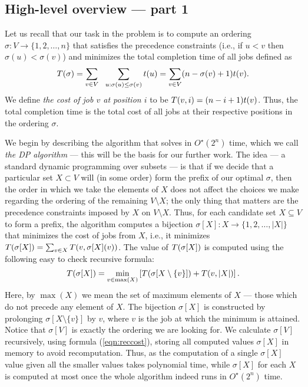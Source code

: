 \documentclass{article}
\theoremstyle{definition}
\begin{document}
\subsection{High-level overview --- part 1}\label{sec:high-level1}
Let us recall that our task in the \schedname{} problem is to compute an ordering $\sigma:V \to \{1,2,\ldots,n\}$
that satisfies the precedence constraints (i.e., if $u < v$ then $\sigma(u) < \sigma(v)$)
and minimizes the total completion time of all jobs defined as
$$\koszt{\sigma} = \sum_{v \in V}\ \ \sum_{u:\sigma(u) \leq \sigma(v)} \czas{u} = \sum_{v \in V} (n-\sigma(v)+1)\czas{v}.$$
We define {\em{the cost of job $v$ at position $i$}} to be $T(v, i) = (n-i+1)t(v)$.
Thus, the total completion time is the total cost of all jobs at their respective
positions in the ordering $\sigma$.

We begin by describing the algorithm that solves \schedname in $O^\star(2^n)$ time, which we call {\em{the DP algorithm}}
--- this will be the basis for our further work.
The idea --- a standard dynamic programming over subsets --- is that if we decide that a particular
set $X \subset V$ will (in some order) form the prefix of our optimal $\sigma$, then the order
in which we take the elements of $X$ does not affect the choices we make regarding the ordering
of the remaining $V\setminus X$; the only thing that matters are the precedence constraints
imposed by $X$ on $V\setminus X$. Thus, for each candidate set $X \subseteq V$ to form a prefix,
the algorithm computes a bijection
$\sigma[X]:X \to \{1,2,\ldots,|X|\}$ that minimizes the cost of jobs from $X$, i.e.,
it minimizes $T(\sigma[X]) = \sum_{v \in X} T(v, \sigma[X](v))$.
The value of $T(\sigma[X])$ is computed using the following easy to check recursive formula:
\begin{equation}\label{eqn:reccost} T(\sigma[X]) = \min_{v \in \max(X)} \left[T(\sigma[X \setminus \{v\}]) + T(v, |X|)\right].\end{equation}
Here, by $\max(X)$ we mean the set of maximum elements of $X$ --- those which do not precede any element of $X$.
The bijection $\sigma[X]$ is constructed by prolonging $\sigma[X\setminus\{v\}]$ by $v$,
where $v$ is the job at which the minimum is attained.
Notice that $\sigma[V]$ is exactly the ordering we are looking for.
We calculate $\sigma[V]$ recursively, using formula (\ref{eqn:reccost}),
storing all computed values $\sigma[X]$ in memory to avoid recomputation.
Thus, as the computation of a single $\sigma[X]$ value given all the smaller values
takes polynomial time, while $\sigma[X]$ for each $X$ is computed at most once
the whole algorithm indeed runs in $O^\star(2^n)$ time.
\end{document}
